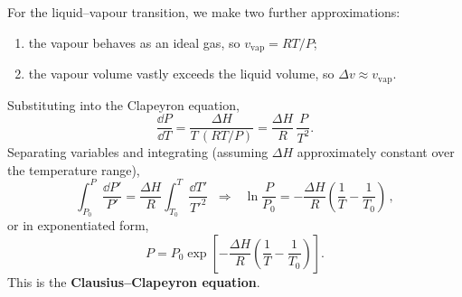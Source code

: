 For the liquid--vapour transition, we make two further approximations:
\begin{enumerate}[label=(\roman*)]
    \item the vapour behaves as an ideal gas, so $v_{\text{vap}} = RT/P$;
    \item the vapour volume vastly exceeds the liquid volume, so $\Delta v \approx v_{\text{vap}}$.
\end{enumerate}
Substituting into the Clapeyron equation,
\[
    \frac{\dd P}{\dd T} = \frac{\Delta H}{T\,(RT/P)} = \frac{\Delta H}{R}\,\frac{P}{T^{2}}.
\]
Separating variables and integrating (assuming $\Delta H$ approximately constant over the temperature range),
\[
    \int_{P_0}^{P} \frac{\dd P'}{P'} = \frac{\Delta H}{R}\int_{T_0}^{T} \frac{\dd T'}{T'^{2}}
    \;\;\Longrightarrow\;\;
    \boxed{\,\ln\!\frac{P}{P_0} = -\frac{\Delta H}{R}\!\left(\frac{1}{T} - \frac{1}{T_0}\right)\,},
\]
or in exponentiated form,
\[
    P = P_0 \exp\!\left[-\frac{\Delta H}{R}\!\left(\frac{1}{T} - \frac{1}{T_0}\right)\right].
\]
This is the \textbf{Clausius--Clapeyron equation}. 

